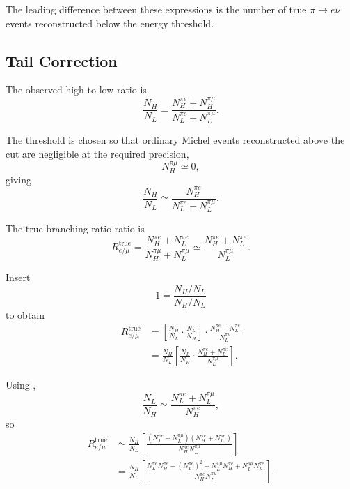 The leading difference between these expressions is the number of true
\(\pi\to e\nu\) events reconstructed below the energy threshold.

\subsection{Tail Correction}
\label{subsec:remu-tail-correction}

The observed high-to-low ratio is
\begin{equation}
  \frac{N_H}{N_L}
  =
  \frac{N_H^{\pi e}+N_H^{\pi\mu}}
       {N_L^{\pi e}+N_L^{\pi\mu}} .
\end{equation}

The threshold is chosen so that ordinary Michel events reconstructed above the
cut are negligible at the required precision,
\begin{equation}
  N_H^{\pi\mu}\simeq0 ,
\end{equation}
giving
\begin{equation}
  \frac{N_H}{N_L}
  \simeq
  \frac{N_H^{\pi e}}
       {N_L^{\pi e}+N_L^{\pi\mu}} .
  \label{eq:observed-tail-ratio}
\end{equation}

The true branching-ratio ratio is
\begin{equation}
  R_{e/\mu}^{\mathrm{true}}
  =
  \frac{N_H^{\pi e}+N_L^{\pi e}}
       {N_H^{\pi\mu}+N_L^{\pi\mu}}
  \simeq
  \frac{N_H^{\pi e}+N_L^{\pi e}}
       {N_L^{\pi\mu}} .
\end{equation}

Insert
\begin{equation}
  1
  =
  \frac{N_H/N_L}{N_H/N_L}
\end{equation}
to obtain
\begin{align}
  R_{e/\mu}^{\mathrm{true}}
  &=
  \left[
    \frac{N_H}{N_L}
    \cdot
    \frac{N_L}{N_H}
  \right]
  \cdot
  \frac{N_H^{\pi e}+N_L^{\pi e}}
       {N_L^{\pi\mu}}
  \\
  &=
  \frac{N_H}{N_L}
  \left[
    \frac{N_L}{N_H}
    \cdot
    \frac{N_H^{\pi e}+N_L^{\pi e}}
         {N_L^{\pi\mu}}
  \right].
\end{align}

Using
,
\begin{equation}
  \frac{N_L}{N_H}
  \simeq
  \frac{N_L^{\pi e}+N_L^{\pi\mu}}
       {N_H^{\pi e}},
\end{equation}
so
\begin{align}
  R_{e/\mu}^{\mathrm{true}}
  &\simeq
  \frac{N_H}{N_L}
  \left[
    \frac{
      (N_L^{\pi e}+N_L^{\pi\mu})
      (N_H^{\pi e}+N_L^{\pi e})
    }
    {
      N_H^{\pi e}N_L^{\pi\mu}
    }
  \right]
  \\
  &=
  \frac{N_H}{N_L}
  \left[
    \frac{
      N_L^{\pi e}N_H^{\pi e}
      +
      (N_L^{\pi e})^2
      +
      N_L^{\pi\mu}N_H^{\pi e}
      +
      N_L^{\pi\mu}N_L^{\pi e}
    }
    {
      N_H^{\pi e}N_L^{\pi\mu}
    }
  \right].
\end{align}

